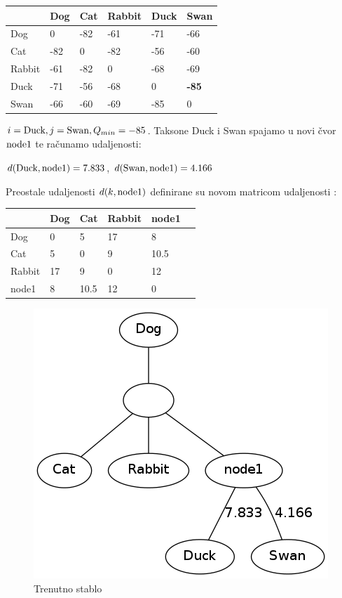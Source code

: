 \documentclass[times, utf8, seminar, numeric]{fer}
\begin{document}
\begin{table}[h]
	\centering
    \begin{tabular}{|l|l|l|l|l|l|}
    \hline
    ~ & Dog  & Cat  & Rabbit  & Duck  & Swan  \\ \hline
    Dog & 0   & -82 & -61 & -71 & -66 \\ \hline
    Cat & -82 & 0   & -82 & -56 & -60 \\ \hline
    Rabbit & -61 & -82 & 0   & -68 & -69 \\ \hline
    Duck & -71 & -56 & -68 & 0   & \textbf{-85} \\ \hline
    Swan & -66 & -60 & -69 & -85 & 0   \\ \hline
    \end{tabular}
\end{table}

$i = \textup{Duck}, j = \textup{Swan}, Q_{min} = -85$. Taksone Duck i Swan spajamo u novi čvor $\textup{node1}$ te računamo udaljenosti: 

\indent $d(\textup{Duck},\textup{node1}) = 7.833$, \newline
\indent $d(\textup{Swan},\textup{node1}) = 4.166$


Preostale udaljenosti $d(k,\textup{node1})$ definirane su novom matricom udaljenosti :

\begin{table}[h]
	\centering
    \begin{tabular}{|l|l|l|l|l|l|}
    \hline
	~ & Dog  & Cat    & Rabbit  & node1 \\ \hline
    Dog     & 0  & 5    & 17 & 8     \\ \hline
    Cat   & 5  & 0    & 9  & 10.5  \\ \hline
    Rabbit     & 17 & 9    & 0  & 12    \\ \hline
    node1 & 8  & 10.5 & 12 & 0     \\ \hline
    \end{tabular}
\end{table}

\begin{figure}[htb]
\centering
\includegraphics[scale=0.6]{./img/prvi.png}
\caption{Trenutno stablo}
\end{figure}
\end{document}
